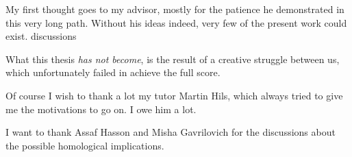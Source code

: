 \thispagestyle{empty}
My first thought goes to my advisor, mostly for the patience he demonstrated in this very long path.
Without his ideas indeed, very few of the present work could exist.
discussions

What this thesis {\em has not become}, is the result of a creative struggle between us, which unfortunately
failed in achieve the full score.

Of course I wish to thank a lot my tutor Martin Hils, which always tried to give me the motivations to go on.
I owe him a lot.

I want to thank Assaf Hasson and Misha Gavrilovich for the discussions about the possible homological implications.